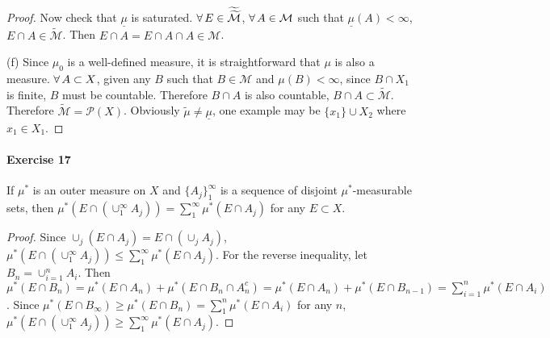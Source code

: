 \begin{proof}
    \par Now check that $\underline{\mu}$ is saturated. $\forall\, E\in\widetilde{\widetilde{\mathcal{M}}}$, $\forall\, A\in{\mathcal{M}}$ such that $\underline{\mu}(A)<\infty$, $E\cap A\in\widetilde{\mathcal{M}}$. Then $E\cap A=E\cap A\cap A\in\mathcal{M}$.
    \par(f) Since $\mu_0$ is a well-defined measure, it is straightforward that $\mu$ is also a measure. $\forall\, A\subset X$, given any $B$ such that $B\in\mathcal{M}$ and $\mu(B)<\infty$, since $B\cap X_1$ is finite, $B$ must be countable. Therefore $B\cap A$ is also countable, $B\cap A\subset\widetilde{\mathcal{M}}$. Therefore $\widetilde{\mathcal{M}}=\mathcal{P}(X)$. Obviously $\widetilde{\mu}\neq\underline{\mu}$, one example may be $\{x_1\}\cup X_2$ where $x_1\in X_1$.
\end{proof}
\paragraph{Exercise 17}
If $\mu^*$ is an outer measure on $X$ and $\{A_j\}_1^\infty$ is a sequence of disjoint $\mu^*$-measurable sets, then $\mu^*(E\cap(\cup^\infty_1A_j))=\sum^\infty_1\mu^*(E\cap A_j)$ for any $E\subset X$.
\begin{proof}
    Since $\cup_j(E\cap A_j)=E\cap(\cup_jA_j)$, $\mu^*(E\cap(\cup^\infty_1A_j))\le\sum^\infty_1\mu^*(E\cap A_j)$. For the reverse inequality, let $B_n=\cup_{i=1}^nA_i$. Then $\mu^*(E\cap B_n)=\mu^*(E\cap A_n)+\mu^*(E\cap B_n\cap A_n^c)=\mu^*(E\cap A_n)+\mu^*(E\cap B_{n-1})=\sum_{i=1}^n\mu^*(E\cap A_i)$. Since $\mu^*(E\cap B_\infty)\ge\mu^*(E\cap B_n)=\sum_1^n\mu^*(E\cap A_i)$ for any $n$, $\mu^*(E\cap(\cup^\infty_1A_j))\ge\sum^\infty_1\mu^*(E\cap A_j)$.
\end{proof}
